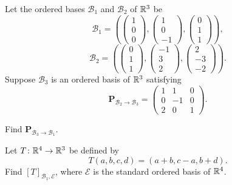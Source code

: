\documentclass[11pt,oneside]{article}
\begin{document}
\begin{problem}
Let the ordered bases $\mathcal B_1$ and $\mathcal B_2$ of $\mathbb{R}^3$ be
\[
\mathcal B_1=
\left(
\begin{pmatrix}1\\0\\0\end{pmatrix},
\begin{pmatrix}1\\0\\-1\end{pmatrix},
\begin{pmatrix}0\\1\\1\end{pmatrix}
\right),
\]
\[
\mathcal B_2=
\left(
\begin{pmatrix}0\\1\\1\end{pmatrix},
\begin{pmatrix}-1\\3\\2\end{pmatrix},
\begin{pmatrix}2\\-3\\-2\end{pmatrix}
\right).
\]
Suppose $\mathcal B_3$ is an ordered basis of $\mathbb{R}^3$ satisfying
\[
\mathbf P_{\mathcal B_2\to\mathcal B_3}=
\begin{pmatrix}
1&1&0\\
0&-1&0\\
2&0&1
\end{pmatrix}.
\]
\begin{problemsubparts}
\item Find $\mathbf P_{\mathcal B_3\to\mathcal B_1}$.
\item Let $T\colon\mathbb{R}^4\to\mathbb{R}^3$ be defined by
\[
T(a,b,c,d)=(a+b,c-a,b+d).
\]
Find $[T]_{\mathcal B_1,\mathcal E}$, where $\mathcal E$ is the standard ordered basis of $\mathbb{R}^4$.
\end{problemsubparts}
\end{problem}
\end{document}
